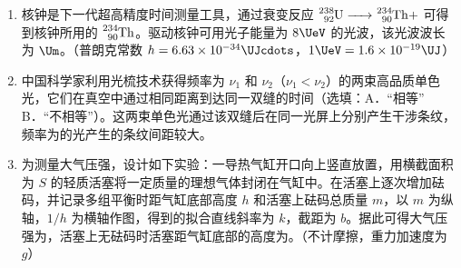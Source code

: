 \documentclass[\gkver]{gaokaozhenti}
\begin{document}
\begin{enumerate}
{月球绕地球做匀速圆周运动，线速度大小

$v = \frac{2\pi r}{T}$

地球对月球的万有引力提供月球做圆周运动的向心力，所以

$F = m\frac{4\pi^{2}}{T^{2}}r = \frac{4\pi^{2}mr}{T^{2}}$
}

\item
核钟是下一代超高精度时间测量工具，通过衰变反应 $\ce{^{238}_{92}U -> ^{234}_{90}Th} +$  可得到核钟所用的 $\ce{^{234}_{90}Th}$。驱动核钟可用光子能量为 $8 \UeV$ 的光波，该光波波长为 $\Um$。（普朗克常数 $h = 6.63\times10^{-34} \UJcdots$，$1 \UeV = 1.6\times10^{-19} \UJ$）

\item
中国科学家利用光梳技术获得频率为 $\nu_{1}$ 和 $\nu_{2}$（$\nu_{1} < \nu_{2}$）的两束高品质单色光，它们在真空中通过相同距离到达同一双缝的时间（选填：A．“相等”   B．“不相等”）。这两束单色光通过该双缝后在同一光屏上分别产生干涉条纹，频率为的光产生的条纹间距较大。

\item
为测量大气压强，设计如下实验：一导热气缸开口向上竖直放置，用横截面积为 $S$ 的轻质活塞将一定质量的理想气体封闭在气缸中。在活塞上逐次增加砝码，并记录多组平衡时距气缸底部高度 $h$ 和活塞上砝码总质量 $m$，以 $m$ 为纵轴，$1/h$ 为横轴作图，得到的拟合直线斜率为 $k$，截距为 $b$。据此可得大气压强为，活塞上无砝码时活塞距气缸底部的高度为。（不计摩擦，重力加速度为 $g$）
\onepicture[w=3cm, align=right]{}
\end{enumerate}
\end{document}
